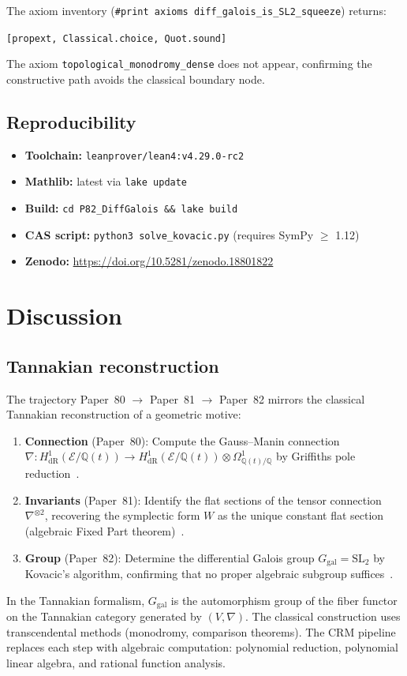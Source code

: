 \documentclass[11pt]{article}
\theoremstyle{plain}
\theoremstyle{definition}
\theoremstyle{remark}
\newcommand{\leanRepo}{\url{https://doi.org/10.5281/zenodo.18801822}}
\newcommand{\Q}{\mathbb{Q}}
\newcommand{\SL}{\mathrm{SL}}
\newcommand{\Ggal}{G_{\mathrm{gal}}}
\newcommand{\HdR}{H^1_{\mathrm{dR}}}
\begin{document}
\noindent
The axiom inventory (\texttt{\#print axioms diff\_galois\_is\_SL2\_squeeze}) returns:
\begin{center}
\texttt{[propext, Classical.choice, Quot.sound]}
\end{center}
The axiom \texttt{topological\_monodromy\_dense} does not appear, confirming the constructive path avoids the classical boundary node.

\subsection{Reproducibility}

\begin{itemize}
\item \textbf{Toolchain:} \texttt{leanprover/lean4:v4.29.0-rc2}
\item \textbf{Mathlib:} latest via \texttt{lake update}
\item \textbf{Build:} \texttt{cd P82\_DiffGalois \&\& lake build}
\item \textbf{CAS script:} \texttt{python3 solve\_kovacic.py} (requires SymPy $\geq$ 1.12)
\item \textbf{Zenodo:} \leanRepo
\end{itemize}

\section{Discussion}
\label{sec:discussion}

\subsection{Tannakian reconstruction}

The trajectory Paper~80 $\to$ Paper~81 $\to$ Paper~82 mirrors the classical Tannakian reconstruction of a geometric motive:
\begin{enumerate}
  \item \textbf{Connection} (Paper~80): Compute the Gauss--Manin connection $\nabla : \HdR(\mathcal{E}/\Q(t)) \to \HdR(\mathcal{E}/\Q(t)) \otimes \Omega^1_{\Q(t)/\Q}$ by Griffiths pole reduction~\cite{Griffiths1969}.
  \item \textbf{Invariants} (Paper~81): Identify the flat sections of the tensor connection $\nabla^{\otimes 2}$, recovering the symplectic form $W$ as the unique constant flat section (algebraic Fixed Part theorem)~\cite{Deligne1972}.
  \item \textbf{Group} (Paper~82): Determine the differential Galois group $\Ggal = \SL_2$ by Kovacic's algorithm, confirming that no proper algebraic subgroup suffices~\cite{Kovacic1986}.
\end{enumerate}
In the Tannakian formalism, $\Ggal$ is the automorphism group of the fiber functor on the Tannakian category generated by $(V, \nabla)$.
The classical construction uses transcendental methods (monodromy, comparison theorems).
The CRM pipeline replaces each step with algebraic computation: polynomial reduction, polynomial linear algebra, and rational function analysis.
\end{document}
